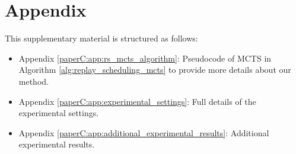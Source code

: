 

\section*{Appendix}
This supplementary material is structured as follows: 
\begin{itemize}[noitemsep]
	\item Appendix \ref{paperC:app:rs_mcts_algorithm}: Pseudocode of MCTS in Algorithm \ref{alg:replay_scheduling_mcts} to provide more details about our method. 
	\item Appendix \ref{paperC:app:experimental_settings}: Full details of the experimental settings.
	\item Appendix \ref{paperC:app:additional_experimental_results}: Additional experimental results. 
\end{itemize}




\clearpage





%
%

%


%






